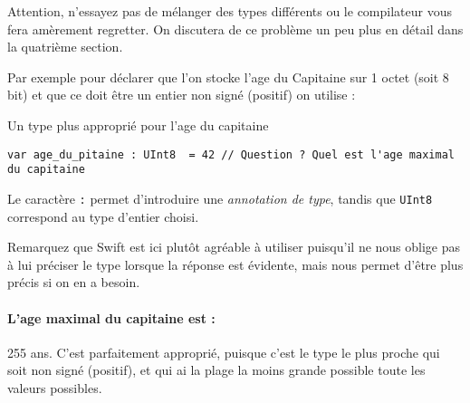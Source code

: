 Attention, n'essayez pas de mélanger des types différents ou le compilateur vous fera amèrement regretter. On discutera de ce problème un peu plus en détail dans la quatrième section.

Par exemple pour déclarer que l'on stocke l'age du Capitaine sur 1 octet (soit 8 bit) et que ce doit être un entier non signé (positif) on utilise :

\begin{listing}[h]
\caption{Un type plus approprié pour l'age du capitaine}
\begin{verbatim}
var age_du_pitaine : UInt8  = 42 // Question ? Quel est l'age maximal du capitaine
\end{verbatim}
\end{listing}
Le caractère \verb":" permet d'introduire une \emph{annotation de type}, tandis que \verb"UInt8" correspond au type d'entier choisi.

Remarquez que Swift est ici plutôt agréable à utiliser puisqu'il ne nous oblige pas à lui préciser le type lorsque la réponse est évidente, mais nous permet d'être plus précis si on en a besoin.
\paragraph{L'age maximal du capitaine est :}
255 ans.
C'est parfaitement approprié, puisque c'est le type le plus proche qui soit non signé (positif), et qui ai la plage la moins grande possible toute les valeurs possibles.
